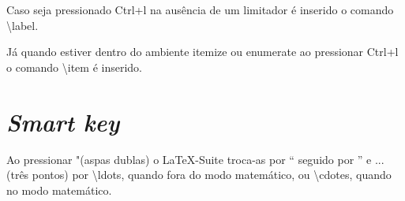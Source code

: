 Caso seja pressionado \textsf{Ctrl}+\textsf{l} na ausência de um limitador é inserido o comando \textbackslash\textsf{label}.

Já quando estiver dentro do ambiente \textsf{itemize} ou \textsf{enumerate} ao pressionar \textsf{Ctrl}+\textsf{l} o comando \textbackslash\textsf{item} é inserido.

\section{\textit{Smart key}}
Ao pressionar "(aspas dublas) o LaTeX-Suite troca-as por `` seguido por '' e ...(três pontos) por \textbackslash\textsf{ldots}, quando fora do modo matemático, ou \textbackslash\textsf{cdotes}, quando no modo matemático.
